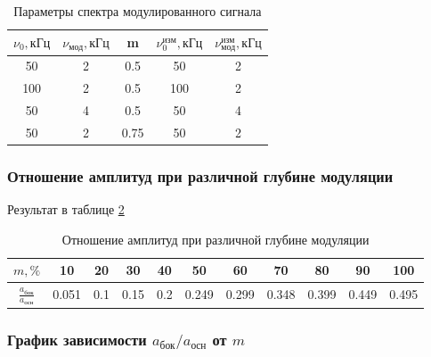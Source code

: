 \documentclass[a4paper, 12pt]{article}
\begin{document}
                \begin{table}[!ht]
                    \centering
                    \begin{tabular}{|c|c|c|c|c|}
                        \hline

                        $\nu_0, кГц$ & $\nu_{мод}, кГц$ & m & $\nu_0^{изм}, кГц$ & $\nu_{мод}^{изм}, кГц$\\ \hline
                        50 & 2 & 0.5 & 50 & 2\\ \hline
                        100 & 2 & 0.5 & 100 & 2\\ \hline
                        50 & 4 & 0.5 & 50 & 4\\ \hline
                        50 & 2 & 0.75 & 50 & 2\\ \hline

                    \end{tabular}
                    \caption{Параметры спектра модулированного сигнала}
                    \label{tab:D.21}
                \end{table}

            \subsubsection{Отношение амплитуд при различной глубине модуляции}

                Результат в таблице \ref{tab:D.22}

                \begin{table}[!ht]
                    \centering
                    \begin{tabular}{|c|c|c|c|c|c|c|c|c|c|c|}
                        \hline

                        $m, \%$ & 10 & 20 & 30 & 40 & 50 & 60 & 70 & 80 & 90 & 100\\ \hline
                        $\frac{a_{бок}}{a_{осн}}$ & 0.051 & 0.1 & 0.15 & 0.2 & 0.249 & 0.299 & 0.348 & 0.399 & 0.449 & 0.495\\ \hline

                    \end{tabular}
                    \caption{Отношение амплитуд при различной глубине модуляции}
                    \label{tab:D.22}
                \end{table}

            \subsubsection{График зависимости $a_{бок}/a_{осн}$ от $m$}
\end{document}
